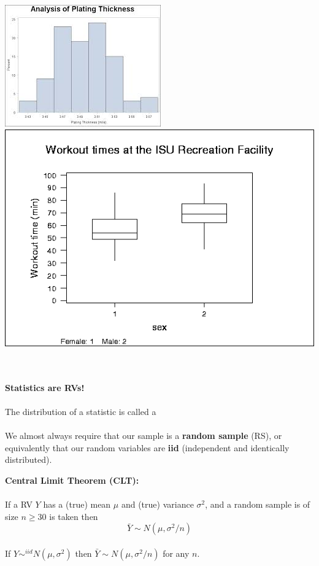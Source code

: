 \begin{center}
\includegraphics[scale=1]{histogram}~~~~~~~~~~~\includegraphics[scale=0.5]{boxplot}
\end{center}

~\\~\\
\Large \textbf{Statistics are RVs!}\large\\~\\
The distribution of a statistic is called a
\textcolor{red}{}\\~\\

We almost always require that our sample is a \textbf{random sample} (RS), or equivalently that our random variables are \textbf{iid} (independent and identically distributed).

\newpage

\textbf{Central Limit Theorem (CLT):}\\~\\
If a RV $Y$ has a (true) mean $\mu$ and (true) variance $\sigma^2$, and a random sample is of size $n\geq 30$ is taken then\\
$$\bar{Y}\sim N(\mu,\sigma^2/n)$$\\
If $Y\sim^{iid} N(\mu,\sigma^2)$ then $\bar{Y}\sim N(\mu,\sigma^2/n)$ for any $n$.\\

